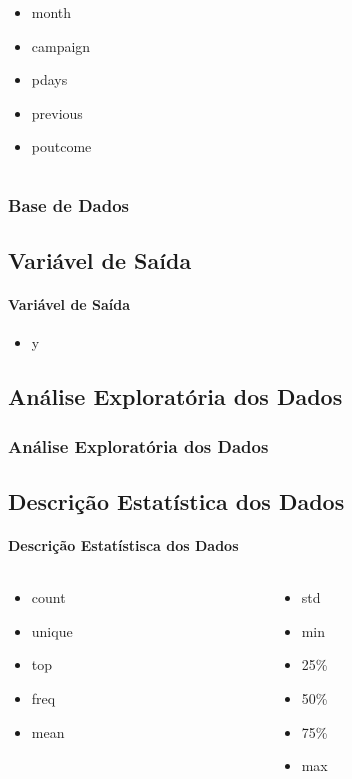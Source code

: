 \documentclass{beamer}
\begin{document}
\begin{frame}
\begin{columns}
\begin{column}{0.5\textwidth}
\begin{itemize}
            \item month
        
            \item campaign
            
            \item pdays
        
            \item previous
        
            \item poutcome
        \end{itemize}
    \end{column}
\end{columns}


\end{frame}


\begin{frame}
\frametitle{Base de Dados}
\subsection{Variável de Saída}
\framesubtitle{Variável de Saída}
\begin{itemize}
\item y
\end{itemize}   
\end{frame}

\begin{frame}
\section{Análise Exploratória dos Dados}
\frametitle{Análise Exploratória dos Dados}
\subsection{Descrição Estatística dos Dados}
\framesubtitle{Descrição Estatístisca dos Dados} 
\begin{columns}
\begin{column}{0.5\textwidth}
    \begin{itemize}
        \item count 
        \item unique
        \item top
        \item freq
        \item mean
    \end{itemize}
\end{column}
\begin{column}{0.5\textwidth}
    \begin{itemize}
        \item std
        \item min
        \item 25\%
        \item 50\%
        \item 75\%
        \item max
    \end{itemize}
\end{column}
\end{columns}
\end{frame}
    
\end{document}
